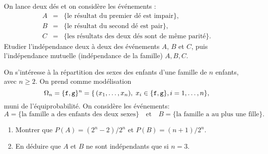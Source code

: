 \documentclass[a4paper,12pt,reqno]{amsart}
\begin{document}
\begin{exo}

  On lance deux dés et on considère les événements :
  \begin{eqnarray*}
    A & = & \{\text{le résultat du premier dé est impair}\},\\
    B & = & \{\text{le résultat du second dé est pair}\},\\
    C & = & \{\text{les résultats des deux dés sont de même parité}\}.
  \end{eqnarray*}
  Etudier l'indépendance deux à deux des événements $A$, $B$ et $C$,
  puis l'indépendance mutuelle (indépendance de la famille) $A,B,C$.

\end{exo}

\begin{exo}

  On s'intéresse à la répartition des sexes des enfants d'une famille de
  $n$ enfants, avec $n\geq 2$. On prend comme modélisation
    $$
      \Omega_n=\{{\tt f},{\tt g}\}^n=\{\,(x_1,\ldots,x_n),\; x_i\in\{{\tt f},{\tt g}\}, i=1,\dots,n\},
    $$
  muni de l'équiprobabilité. On considère les événements:
    $$
      A=\{\text{la famille a des enfants des deux sexes}\}
        \quad\text{et}\quad
      B=\{\text{la famille a au plus une fille}\}.
    $$

  \begin{enumerate}
    \item  Montrer que $P(A)=(2^n-2)/2^n$ et $P(B)=(n+1)/2^n$.
    \item  En déduire que $A$ et $B$ ne sont indépendants que si $n=3$.
  \end{enumerate}

 \end{exo}
\end{document}
